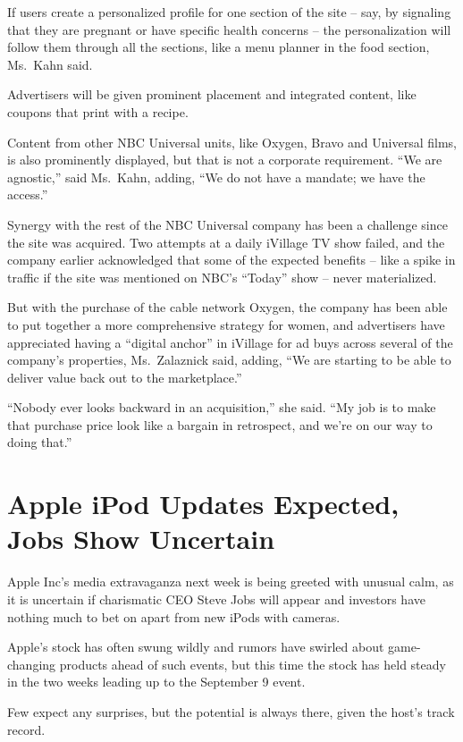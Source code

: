 ﻿\documentclass[12pt]{article}
\begin{document}
If users create a personalized profile for one section of the site -- say, by signaling that they
are pregnant or have specific health concerns -- the personalization will follow them through all
the sections, like a menu planner in the food section, Ms.~Kahn said.

Advertisers will be given prominent placement and integrated content, like coupons that print with a
recipe.

Content from other NBC Universal units, like Oxygen, Bravo and Universal films, is also prominently
displayed, but that is not a corporate requirement. ``We are agnostic,'' said Ms.~Kahn, adding, ``We
do not have a mandate; we have the access.''

Synergy with the rest of the NBC Universal company has been a challenge since the site was acquired.
Two attempts at a daily iVillage TV show failed, and the company earlier acknowledged that some of
the expected benefits -- like a spike in traffic if the site was mentioned on NBC's ``Today'' show
-- never materialized.

But with the purchase of the cable network Oxygen, the company has been able to put together a more
comprehensive strategy for women, and advertisers have appreciated having a ``digital anchor'' in
iVillage for ad buys across several of the company's properties, Ms.~Zalaznick said, adding, ``We
are starting to be able to deliver value back out to the marketplace.''

``Nobody ever looks backward in an acquisition,'' she said. ``My job is to make that purchase price
look like a bargain in retrospect, and we're on our way to doing that.''

\section{Apple iPod Updates Expected, Jobs Show Uncertain}

Apple Inc's media extravaganza next week is being greeted with unusual calm, as it is uncertain if
charismatic CEO Steve Jobs will appear and investors have nothing much to bet on apart from new
iPods with cameras.

Apple's stock has often swung wildly and rumors have swirled about game-changing products ahead of
such events, but this time the stock has held steady in the two weeks leading up to the September 9
event.

Few expect any surprises, but the potential is always there, given the host's track record.
\end{document}
